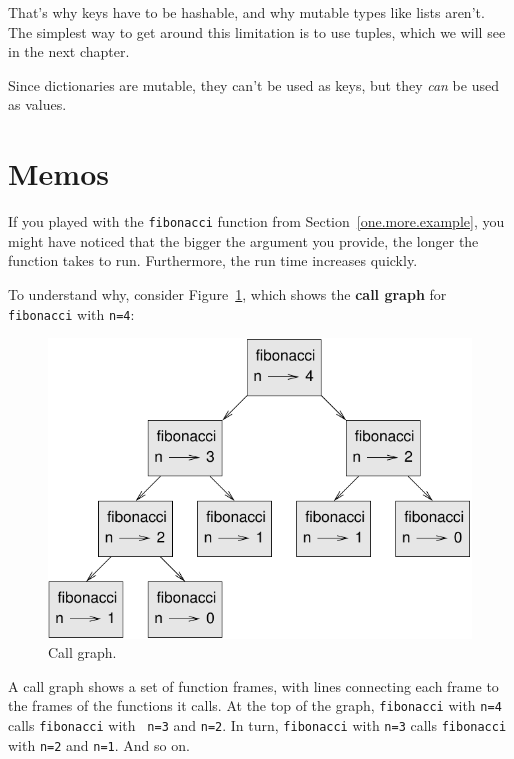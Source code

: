 \documentclass[10pt]{book}
\begin{document}
That's why keys have to be hashable, and why mutable types like
lists aren't.  The simplest way to get around this limitation is to
use tuples, which we will see in the next chapter.

Since dictionaries are mutable, they can't be used as keys,
but they {\em can} be used as values.


\section{Memos}
\label{memoize}

If you played with the {\tt fibonacci} function from
Section~\ref{one.more.example}, you might have noticed that the bigger
the argument you provide, the longer the function takes to run.
Furthermore, the run time increases quickly.

To understand why, consider Figure~\ref{fig.fibonacci}, which shows
the {\bf call graph} for {\tt fibonacci} with {\tt n=4}:

\begin{figure}
\centerline
{\includegraphics[scale=0.7]{figs/fibonacci.pdf}}
\caption{Call graph.}
\label{fig.fibonacci}
\end{figure}

A call graph shows a set of function frames, with lines connecting each
frame to the frames of the functions it calls.  At the top of the
graph, {\tt fibonacci} with {\tt n=4} calls {\tt fibonacci} with {\tt
n=3} and {\tt n=2}.  In turn, {\tt fibonacci} with {\tt n=3} calls
{\tt fibonacci} with {\tt n=2} and {\tt n=1}.  And so on.
\end{document}
